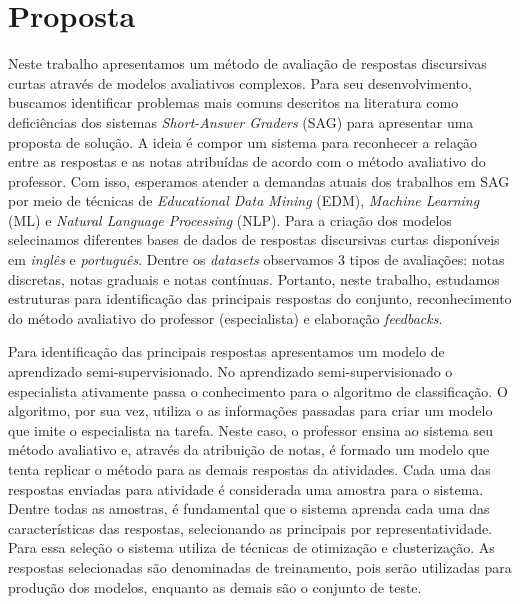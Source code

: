 \section{Proposta}
\label{cap1-proposta}

Neste trabalho apresentamos um método de avaliação de respostas discursivas curtas através de modelos avaliativos complexos. Para seu desenvolvimento, buscamos identificar problemas mais comuns descritos na literatura como deficiências dos sistemas \textit{Short-Answer Graders} (SAG) para apresentar uma proposta de solução. A ideia é compor um sistema para reconhecer a relação entre as respostas e as notas atribuídas de acordo com o método avaliativo do professor. Com isso, esperamos atender a demandas atuais dos trabalhos em SAG por meio de técnicas de \textit{Educational Data Mining} (EDM), \textit{Machine Learning} (ML) e \textit{Natural Language Processing} (NLP). Para a criação dos modelos selecinamos diferentes bases de dados de respostas discursivas curtas disponíveis em \textit{inglês} e \textit{português}. Dentre os \textit{datasets} observamos 3 tipos de avaliações: notas discretas, notas graduais e notas contínuas. Portanto, neste trabalho, estudamos estruturas para identificação das principais respostas do conjunto, reconhecimento do método avaliativo do professor (especialista) e elaboração \textit{feedbacks}. 

Para identificação das principais respostas apresentamos um modelo de aprendizado semi-supervisionado. No aprendizado semi-supervisionado o especialista ativamente passa o conhecimento para o algoritmo de classificação. O algoritmo, por sua vez, utiliza o as informações passadas para criar um modelo que imite o especialista na tarefa. Neste caso, o professor ensina ao sistema seu método avaliativo e, através da atribuição de notas, é formado um modelo que tenta replicar o método para as demais respostas da atividades. Cada uma das respostas enviadas para atividade é considerada uma amostra para o sistema. Dentre todas as amostras, é fundamental que o sistema aprenda cada uma das características das respostas, selecionando as principais por representatividade. Para essa seleção o sistema utiliza de técnicas de otimização e clusterização. As respostas selecionadas são denominadas de treinamento, pois serão utilizadas para produção dos modelos, enquanto as demais são o conjunto de teste.

